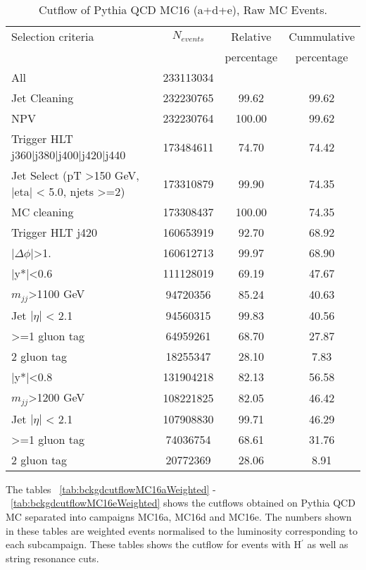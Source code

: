\begin{table}[ht]
\begin{center}
\begin{tabular}{|l|c|c|c|}
\hline
Selection criteria & $N_{events}$ & Relative & Cummulative \\
 & & percentage & percentage \\
\hline
All & 233113034 &  & \\
Jet Cleaning & 232230765 & 99.62 & 99.62 \\
NPV & 232230764 & 100.00 & 99.62 \\
Trigger HLT j360|j380|j400|j420|j440 & 173484611 & 74.70 & 74.42 \\
Jet Select (pT >150 GeV, |eta| < 5.0, njets >=2) & 173310879 & 99.90 & 74.35 \\
MC cleaning & 173308437 & 100.00 & 74.35 \\
\hline
Trigger HLT j420 & 160653919 & 92.70 & 68.92 \\
$|\Delta\phi|$>1. & 160612713 & 99.97 & 68.90 \\
\hline\hline
|y*|<0.6 & 111128019 & 69.19 & 47.67 \\
$m_{jj}$>1100 GeV & 94720356 & 85.24 & 40.63 \\
Jet $|\eta|$ < 2.1 & 94560315 & 99.83 & 40.56 \\
>=1 gluon tag & 64959261 & 68.70 & 27.87 \\
2 gluon tag & 18255347 & 28.10 & 7.83 \\
\hline\hline
|y*|<0.8 & 131904218 & 82.13 & 56.58 \\
$m_{jj}$>1200 GeV & 108221825 & 82.05 & 46.42 \\
Jet $|\eta|$ < 2.1 & 107908830 & 99.71 & 46.29 \\
>=1 gluon tag & 74036754 & 68.61 & 31.76 \\
2 gluon tag & 20772369 & 28.06 & 8.91 \\
\hline
\end{tabular}
\end{center}
\caption{Cutflow of Pythia QCD MC16 (a+d+e), Raw MC Events.}
\label{tab:bckgdcutflowMC16aeTotalRaw}
\end{table}%

The tables ~\ref{tab:bckgdcutflowMC16aWeighted} - ~\ref{tab:bckgdcutflowMC16eWeighted} shows the cutflows obtained on Pythia QCD MC separated into campaigns MC16a, MC16d and MC16e. The numbers shown in these tables are weighted events normalised to the luminosity corresponding to each subcampaign. These tables shows the cutflow for events with H$^\prime$ as well as string resonance cuts.

